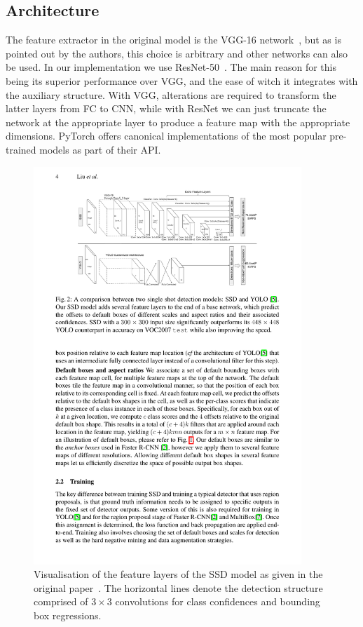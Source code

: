 \subsection*{Architecture}
The feature extractor in the original model is the VGG-16 network~\parencite{simonyan2015deep}, but as is pointed out by the authors, this choice is arbitrary and other networks can also be used.
In our implementation we use ResNet-50~\parencite{he2015deep}.
The main reason for this being its superior performance over VGG, and the ease of witch it integrates with the auxiliary structure.
With VGG, alterations are required to transform the latter layers from FC to CNN, while with ResNet we can just truncate the network at the appropriate layer to produce a feature map with the appropriate dimensions.
PyTorch offers canonical implementations of the most popular pre-trained models as part of their API\@.

\begin{figure}[htb]
  \centering
  \includegraphics[width=0.9\textwidth]{figs/SSD_model.pdf}
  \caption[SSD architecture]{Visualisation of the feature layers of the SSD model as given in the original paper~\parencite{liu_ssd_2016}.
The horizontal lines denote the detection structure comprised of \(3\times 3\) convolutions for class confidences and bounding box regressions.}\label{fig:model}
\end{figure}

